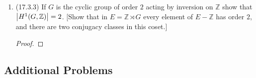\documentclass[11pt]{article}
\DeclareMathOperator{\im}{im}
\begin{document}
\begin{enumerate}
\begin{enumerate}
\begin{proof}
            The next cohomology group is $H^1(G,A) = \ker(0)/\im(\sigma-1)\cong A/(\sigma-1)A$. The remaining cohomology groups for $n\geq 2$ are given by $H^n(G,A) = \ker(0)/\im(0) = 0$. 
        \end{proof}
    \end{enumerate}
    \item (17.3.3) If $G$ is the cyclic group of order $2$ acting by inversion on $\mathbb{Z}$ show that $\abs{H^1(G,\mathbb{Z})} = 2$. [Show that in $E = \mathbb{Z}\rtimes G$ every element of $E-\mathbb{Z}$ has order $2$, and there are two conjugacy classes in this coset.] \begin{proof}
        
    \end{proof}
\end{enumerate}
\subsection*{Additional Problems}
\end{document}
